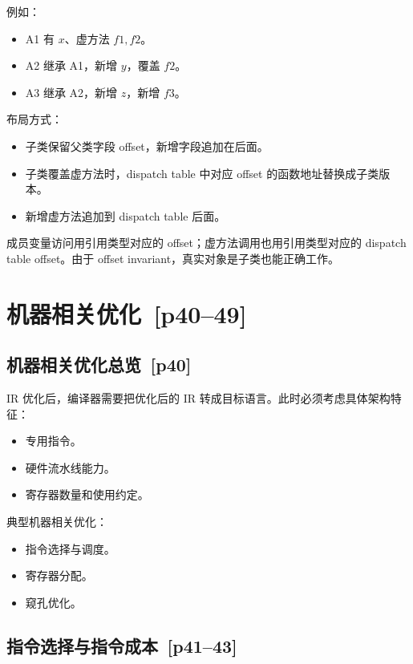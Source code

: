 \documentclass[UTF8,fontset=none,11pt]{ctexart}
\newcommand{\pg}[1]{\texorpdfstring{{\small\color{graytext}\,[p#1]}}{ [p#1]}}
\begin{document}
例如：

\begin{itemize}
  \item A1 有 \(x\)、虚方法 \(f1,f2\)。
  \item A2 继承 A1，新增 \(y\)，覆盖 \(f2\)。
  \item A3 继承 A2，新增 \(z\)，新增 \(f3\)。
\end{itemize}

布局方式：

\begin{itemize}
  \item 子类保留父类字段 offset，新增字段追加在后面。
  \item 子类覆盖虚方法时，dispatch table 中对应 offset 的函数地址替换成子类版本。
  \item 新增虚方法追加到 dispatch table 后面。
\end{itemize}

成员变量访问用引用类型对应的 offset；虚方法调用也用引用类型对应的 dispatch table offset。由于 offset invariant，真实对象是子类也能正确工作。

\section{机器相关优化 \pg{40--49}}

\subsection{机器相关优化总览 \pg{40}}

IR 优化后，编译器需要把优化后的 IR 转成目标语言。此时必须考虑具体架构特征：

\begin{itemize}
  \item 专用指令。
  \item 硬件流水线能力。
  \item 寄存器数量和使用约定。
\end{itemize}

典型机器相关优化：

\begin{itemize}
  \item 指令选择与调度。
  \item 寄存器分配。
  \item 窥孔优化。
\end{itemize}

\subsection{指令选择与指令成本 \pg{41--43}}
\end{document}
